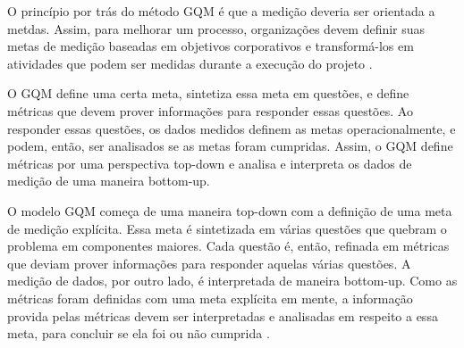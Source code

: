O princípio por trás do método GQM é que a medição deveria ser orientada a metdas.
Assim, para melhorar um processo, organizações devem definir suas metas de medição
baseadas em objetivos corporativos e transformá-los em atividades que podem ser
 medidas durante a execução do projeto \cite{egon}.

O GQM define uma certa meta, sintetiza essa meta em questões, e define métricas
que devem prover informações para responder essas questões. Ao responder essas
questões, os dados medidos definem as metas operacionalmente, e podem, então,
ser analisados se as metas foram cumpridas. Assim, o GQM define métricas por uma
perspectiva top-down e analisa e interpreta os dados de medição de uma maneira
bottom-up.

O modelo GQM começa de uma maneira top-down com a definição de uma meta de medição
explícita. Essa meta é sintetizada em várias questões que quebram o problema em
componentes maiores. Cada questão é, então, refinada em métricas que deviam prover
informações para responder aquelas várias questões. A medição de dados, por outro
lado, é interpretada de maneira bottom-up. Como as métricas foram definidas com
uma meta explícita em mente, a informação provida pelas métricas devem ser
interpretadas e analisadas em respeito a essa meta, para concluir se ela foi
ou não cumprida \cite{egon}.
